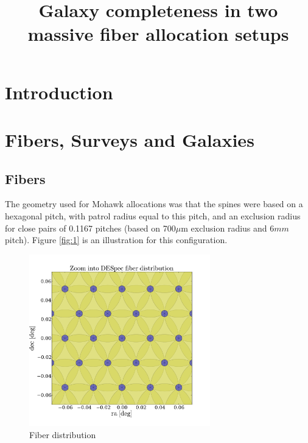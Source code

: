 \documentclass{article}
\title{Galaxy completeness in two massive fiber allocation setups}
\begin{document}
\maketitle
\section{Introduction}

\section{Fibers, Surveys and Galaxies}

\subsection{Fibers}

The geometry used for Mohawk allocations was that the spines were based on
a hexagonal pitch, with patrol radius equal to this pitch, and an
exclusion radius for close pairs of 0.1167 pitches (based on 700$\mu$m 
exclusion radius and $6mm$ pitch). Figure \ref{fig:1} is an
illustration for this configuration. 


\begin{figure}
\begin{center}
\includegraphics[keepaspectratio=true,width=0.7\textwidth]{DES_fibers_zoom.pdf}
\caption{Fiber distribution}
\end{center}
\end{figure}
\end{document}

